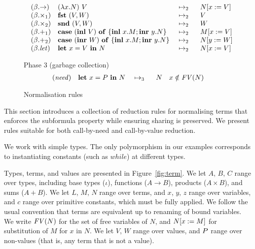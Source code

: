 {\begin{figure*}[t]
\[\begin{array}[t]{@{\quad}llll@{}}
(\beta.{\rightarrow})
& \expapp{(\expabs{x}{A}{N})}{V}
& \ \rewrite{}{2}{}\ \
& \sbs{N}{x}{V} \\

(\beta.{\times_1})
& \expfst{\expprd{V}{W}}
& \ \rewrite{}{2}{}\ \
& V \\

(\beta.{\times_2})
& \expsnd{\expprd{V}{W}}
& \ \rewrite{}{2}{}\ \
& W \\

(\beta.{+_1})
& \expcas{(\explft{V}{B})}{x}{M}{y}{N}
& \ \rewrite{}{2}{}\ \
& \sbs{M}{x}{V} \\

(\beta.{+_2})
& \expcas{(\exprgt{A}{W})}{x}{M}{y}{N}
& \ \rewrite{}{2}{}\ \
& \sbs{N}{y}{W} \\

(\beta.{\txt{let}})
& \expshr{x}{V}{N}
& \ \rewrite{}{2}{}\ \
& \sbs{N}{x}{V} \\
\end{array}
\]

Phase 3 (garbage collection)
\[
\begin{array}[t]{@{}llll@{\quad}l@{}}

(\txt{need})
& \expshr{x}{\nv}{N}
& \ \rewrite{}{3}{}\ \
& N %
& \cnd{%
       x \notin \fv{N}}\\
\end{array}
\]
\caption{Normalisation rules}
\label{fig:norm}
\end{figure*}
}


\figterm
\fignf
\fignorm


This section introduces a collection of reduction rules for
normalising terms that enforces the subformula property 
while ensuring sharing is preserved. We present rules
suitable for both call-by-need and call-by-value reduction.

We work with simple types. The only polymorphism in our examples
corresponds to instantiating constants (such as $\mathit{while}$) at
different types.

Types, terms, and values are presented in Figure~\ref{fig:term}. We
let $A$, $B$, $C$ range over types, including base types ($\iota$),
functions ($A \to B$), products ($A \times B$), and sums ($A + B$).
We let $L$, $M$, $N$ range over terms, and $x$, $y$, $z$ range over
variables, and $c$ range over primitive constants, which must be fully
applied. We follow the usual convention that terms are equivalent up
to renaming of bound variables. We write $\text{\textit{FV}}(N)$ for the set of free
variables of $N$, and $N[x:=M]$ for substitution of $M$ for $x$
in $N$.
%
%
We let $V$, $W$ range over values, and $P$ range over non-values
(that is, any term that is not a value).

